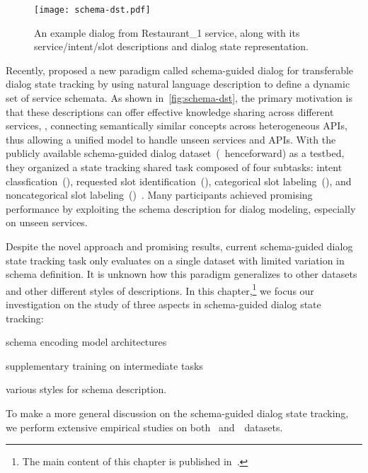 \begin{figure}[!ht]
\centering
  \texttt{[image: schema-dst.pdf]}
  \caption{\label{fig:schema-dst} An example dialog from Restaurant\_1 service, along with its service/intent/slot descriptions and dialog state representation.}
\end{figure}


Recently, \citet{rastogi2019towards} proposed a new paradigm called
schema-guided dialog for transferable dialog state tracking by using
natural language description to define a dynamic set of service
schemata. As shown in~\autoref{fig:schema-dst}, the primary
motivation is that these descriptions can offer effective knowledge
sharing across different services, \ie, connecting semantically
similar concepts across heterogeneous APIs, thus allowing a unified
model to handle unseen services and APIs. With the publicly available
schema-guided dialog dataset~(\sgdst~henceforward) as a
testbed, they organized a state tracking shared task composed of four subtasks:
intent classfication~(\IC), requested slot identification~(\RSI),
categorical slot labeling~(\CSL), and noncategorical slot
labeling~(\NSL)~\cite{rastogi2020schema}. Many participants achieved
promising performance by exploiting the schema description for dialog
modeling, especially on unseen services.

Despite the novel approach and promising results, current
schema-guided dialog state tracking task only evaluates on a single
dataset with limited variation in schema definition. It is unknown how
this paradigm generalizes to other datasets and other different styles
of descriptions. In this chapter,\footnote{The main content of this
  chapter is published in~\citet{cao2021schema}.} we focus
our investigation on the study of three aspects in schema-guided
dialog state tracking:
\begin{inparaenum}[(1)]
\item schema encoding model architectures
\item supplementary training on intermediate tasks
\item various styles for schema description.
\end{inparaenum}
To make a more general discussion on
the schema-guided dialog state tracking, we perform extensive
empirical studies on both \sgdst~and~\multiwoz~datasets.


